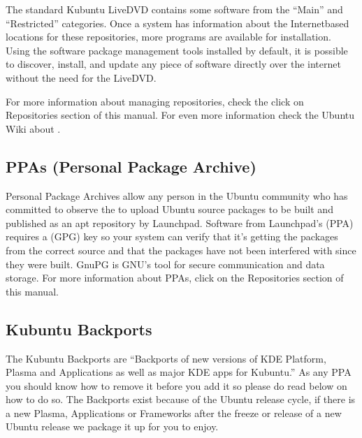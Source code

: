 \documentclass[letterpaper,10pt,english]{sphinxmanual}
\begin{document}
\sphinxAtStartPar
The standard Kubuntu LiveDVD contains some software from the “Main” and “Restricted” categories. Once a system has information about the Internet\sphinxhyphen{}based locations for these repositories, more programs are available for installation. Using the software package management tools installed by default, it is possible to discover, install, and update any piece of software directly over the internet without the need for the LiveDVD.

\sphinxAtStartPar
For more information about managing repositories, check the click on Repositories section of this manual. For even more information check the Ubuntu Wiki about .


\subsection{PPAs (Personal Package Archive)}
\label{\detokenize{docs/software-management/repositories:ppas-personal-package-archive}}
\sphinxAtStartPar
Personal Package Archives allow any person in the Ubuntu community who has committed to observe the  to upload Ubuntu source packages to be built and published as an apt repository by Launchpad. Software from Launchpad’s  (PPA) requires a  (GPG) key so your system can verify that it’s getting the packages from the correct source and that the packages have not been interfered with since they were built. GnuPG is GNU’s tool for secure communication and data storage. For more information about PPAs, click on the Repositories section of this manual.


\subsection{Kubuntu Backports}
\label{\detokenize{docs/software-management/repositories:kubuntu-backports}}
\sphinxAtStartPar
The Kubuntu Backports are “Backports of new versions of KDE Platform, Plasma and Applications as well as major KDE apps for Kubuntu.” As any PPA you should know how to remove it before you add it so please do read below on how to do so. The Backports exist because of the Ubuntu release cycle, if there is a new Plasma, Applications or Frameworks after the freeze or release of a new Ubuntu release we package it up for you to enjoy.
\end{document}
